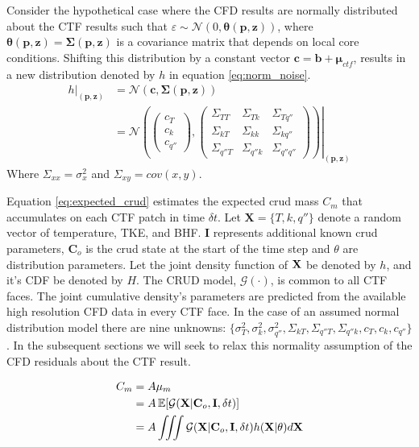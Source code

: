 Consider the hypothetical case where the CFD results are normally distributed about the CTF results such that $\varepsilon \sim \mathcal N(0, \mathbf \theta(\mathbf p, \mathbf z))$, where $\mathbf \theta(\mathbf p, \mathbf z) = \bm \Sigma(\mathbf p, \mathbf z)$ is a covariance matrix that depends on local core conditions.  Shifting this distribution by a constant vector $\bm c=\bm b + \bm \mu_{ctf}$, results in a new distribution denoted by $h$ in equation \ref{eq:norm_noise}.
\begin{align}
    \left. h \right|_{(\bm p, \bm z)} & = \mathcal N(\bm c, \bm \Sigma(\mathbf p, \bm z)) \nonumber \\
    & = \left.
        \mathcal N \left(
        \begin{pmatrix}
            c_T \\
            c_k \\
            c_{q''}
        \end{pmatrix}
    ,
        \begin{pmatrix}
            \Sigma_{TT} & \Sigma_{Tk} & \Sigma_{Tq''} \\
            \Sigma_{kT} & \Sigma_{kk} & \Sigma_{kq''} \\
            \Sigma_{q''T} & \Sigma_{q''k} & \Sigma_{q''q''}
        \end{pmatrix}
    \right)
    \right|_{(\mathbf p, \mathbf z)}
\label{eq:norm_noise}
\end{align}
Where $\Sigma_{xx} = \sigma_x^2$ and $\Sigma_{xy} = cov(x,y)$.

Equation \ref{eq:expected_crud} estimates the expected crud mass $C_m$ that accumulates on each CTF patch in time $\delta t$.  Let $\mathbf X= \{T, k, q''\}$ denote a random vector of temperature, TKE, and BHF. $\mathbf I$ represents additional known crud parameters, $\mathbf C_o$ is the crud state at the start of the time step and $\theta$ are distribution parameters.  Let the joint density function of $\bf X$ be denoted by $h$, and it's CDF be denoted by $H$.  The CRUD model, $\mathcal G(\cdot)$, is common to all CTF faces.  The joint cumulative density's parameters are predicted from the available high resolution CFD data in every CTF face.  In the case of an assumed normal distribution model there are nine unknowns:  $\{ \sigma^2_T, \sigma^2_k, \sigma^2_{q''}, \Sigma_{kT}, \Sigma_{q''T}, \Sigma_{q''k}, c_T, c_k, c_{q''} \}$.  In the subsequent sections we will seek to relax this normality assumption of the CFD residuals about the CTF result.

\begin{align}
        C_m &= A \mu_{m} \nonumber \\
        &= A \operatorname*{\mathbb{E}}[\mathcal G(\mathbf X|\mathbf C_o, \mathbf I, \delta t)] \nonumber \\
        &= A \iiint \mathcal G(\mathbf X|\mathbf C_o, \mathbf I, \delta t) h(\mathbf X|\theta) d \mathbf X
        \label{eq:expected_crud}
\end{align}

